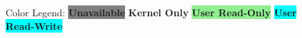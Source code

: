 \begin{figure}

    \newcommand{\memsection}[6][lrtb]{%
        \bytefieldsetup{bitheight=#4\baselineskip}%
        \bitbox[]{10}{
            \texttt{#2} \\ %
            \vspace{#4\baselineskip}
            \vspace{-2\baselineskip}
            \vspace{-#4pt}
            \texttt{#3} %
        }
        \bitbox[#1]{16}[bgcolor=#5]{\small #6}
    }

    \newcommand{\memgap}[2][lrtb]{
        \bytefieldsetup{bitheight=#2\baselineskip}
        \bitbox[#1]{16}[bgcolor=gray]{\small Gap}
    }

    Color Legend:
    \colorbox{gray}{\textbf{Unavailable}}
    \colorbox{lightred}{\textbf{Kernel Only}}
    \colorbox{lightgreen}{\textbf{User Read-Only}}
    \colorbox{cyan}{\textbf{User Read-Write}}


\end{figure}
